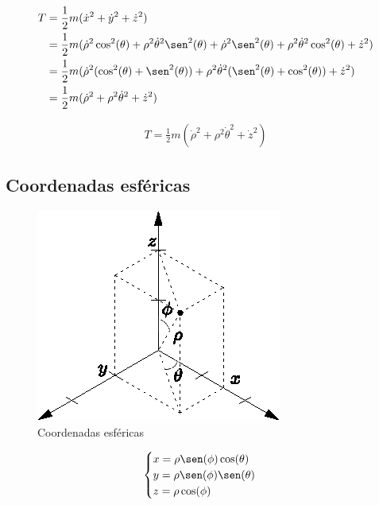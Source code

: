 \begin{equation*}
\begin{split}
    T&=\frac{1}{2}m(\dot{x}^2+\dot{y}^2+\dot{z}^2)\\
     &=\frac{1}{2}m(\dot{\rho}^2\cos^2(\theta)+
       \rho^2\dot{\theta}^2\sen^2(\theta)+
       \dot{\rho}^2\sen^2(\theta)+
       \rho^2\dot{\theta}^2\cos^2(\theta)+
       \dot{z}^2)\\
     &=\frac{1}{2}m(\dot{\rho}^2(\cos^2(\theta)+
       \sen^2(\theta))+
       \rho^2\dot{\theta}^2(\sen^2(\theta)+
       \cos^2(\theta))+
       \dot{z}^2)\\
     &=\frac{1}{2}m(\dot{\rho}^2+\rho^2\dot{\theta}^2+\dot{z}^2)\\
\end{split}
\end{equation*}

\begin{equation}
\boxed{
    \begin{array}{l}
        T=\frac{1}{2}m(\dot{\rho}^2+\rho^2\dot{\theta}^2+\dot{z}^2)
    \end{array}
}
\end{equation}

\subsection{Coordenadas esféricas}

\begin{figure}[H]
    \centering
    \includegraphics[scale=1.5]{resources/figura_03.eps}
    \caption{Coordenadas esféricas}\label{figura_03}
\end{figure}

\begin{equation*}
    \begin{cases}
        x=\rho\sen(\phi)\cos(\theta)\\
        y=\rho\sen(\phi)\sen(\theta)\\
        z=\rho\cos(\phi)
    \end{cases}
\end{equation*}

